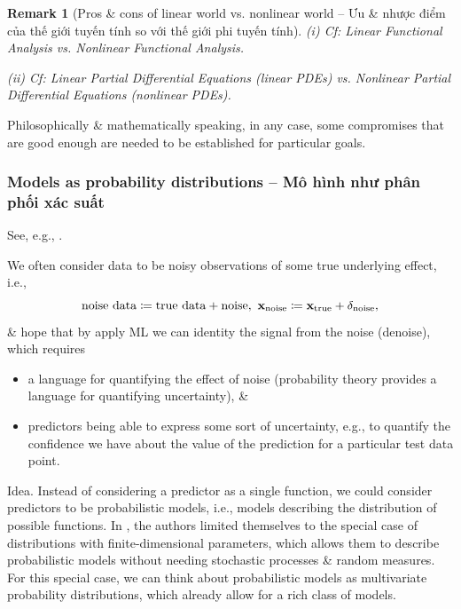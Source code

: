\documentclass{article}
\newtheorem{remark}{Remark}
\begin{document}
\begin{remark}[Pros \& cons of linear world vs. nonlinear world -- Ưu \& nhược điểm của thế giới tuyến tính so với thế giới phi tuyến tính]
	\item(i) Cf: Linear Functional Analysis vs. Nonlinear Functional Analysis.
	\item(ii) Cf: Linear Partial Differential Equations (linear PDEs) vs. Nonlinear Partial Differential Equations (nonlinear PDEs).
\end{remark}
Philosophically \& mathematically speaking, in any case, some compromises that are good enough are needed to be established for particular goals.


\subsubsection{Models as probability distributions -- Mô hình như phân phối xác suất}
See, e.g., \cite[Chap. 8, Sect. 8.1.3: Models as Probability Distributions]{Deisenroth_Faisal_Ong2024}.

We often consider data to be noisy observations of some true underlying effect, i.e.,
\begin{equation*}
	\mbox{noise data}\coloneqq\mbox{true data} + \mbox{noise},\ {\bf x}_{\rm noise}\coloneqq{\bf x}_{\rm true} + \delta_{\rm noise},
\end{equation*}
\& hope that by apply ML we can identity the signal from the noise (denoise), which requires
\begin{itemize}
	\item a language for quantifying the effect of noise (probability theory provides a language for quantifying uncertainty), \&
	\item predictors being able to express some sort of uncertainty, e.g., to quantify the confidence we have about the value of the prediction for a particular test data point.
\end{itemize}
{\sf Idea.} Instead of considering a predictor as a single function, we could consider predictors to be probabilistic models, i.e., models describing the distribution of possible functions. In \cite{Deisenroth_Faisal_Ong2024}, the authors limited themselves to the special case of distributions with finite-dimensional parameters, which allows them to describe probabilistic models without needing stochastic processes \& random measures. For this special case, we can think about probabilistic models as multivariate probability distributions, which already allow for a rich class of models.
\end{document}
